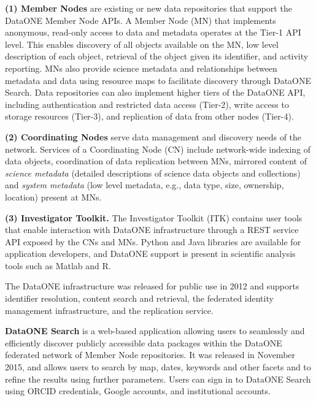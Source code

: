 \documentclass[a4paper]{llncs}
\newcommand{\mypara}[1]{\vspace{4pt}\noindent\textbf{#1}}
\begin{document}
\mypara{(1) Member Nodes} are existing or new data repositories that support the DataONE Member Node APIs.  A Member Node (MN) that implements anonymous, read-only access to data and metadata operates at the Tier-1 API level. This enables discovery of all objects available on the MN, low level description of each object, retrieval of the object given its identifier, and activity reporting. MNs also provide science metadata and relationships between metadata and data using resource maps \cite{oaiore} to facilitate discovery through DataONE Search.  Data repositories can also implement higher tiers of the DataONE API, including authentication and restricted data access (Tier-2), write access to storage resources (Tier-3), and replication of data from other nodes
(Tier-4).


\mypara{(2) Coordinating Nodes} serve data management and discovery needs of the network. Services of a Coordinating Node (CN) include network-wide indexing of data objects, coordination of data replication between MNs, mirrored content of \emph{science metadata} (detailed descriptions of science data objects and collections) and \emph{system metadata} (low level metadata, e.g., data type, size, ownership, location) present at MNs.


\mypara{(3) Investigator Toolkit.} The Investigator Toolkit (ITK) contains user tools that enable interaction with DataONE infrastructure through a REST service API exposed by the CNs and MNs. Python and Java libraries are available for application developers, and DataONE support is present in scientific analysis tools such as Matlab and R.


The DataONE infrastructure was released for public use in 2012 and supports identifier resolution, content search and retrieval, the federated identity management infrastructure, and the replication service.


\mypara{DataONE Search} is a web-based application allowing users to seamlessly and efficiently discover publicly accessible data packages within the DataONE federated network of Member Node repositories. It was released in November 2015, and allows users to search by map, dates, keywords and other facets and to refine the results using further parameters. Users can sign in to DataONE Search using ORCID credentials, Google accounts, and institutional accounts.
\end{document}
